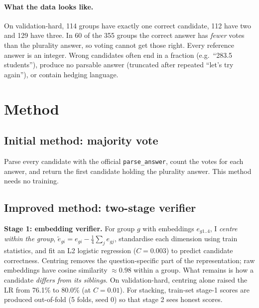 \documentclass[10pt,a4paper]{article}
\begin{document}
\paragraph{What the data looks like.} On validation-hard, 114 groups have exactly one correct candidate, 112 have two and 129 have three. In 60 of the 355 groups the correct answer has \emph{fewer} votes than the plurality answer, so voting cannot get those right. Every reference answer is an integer. Wrong candidates often end in a fraction (e.g.\ ``283.5 students''), produce no parsable answer (truncated after repeated ``let's try again''), or contain hedging language.

\section{Method}
\subsection{Initial method: majority vote}
Parse every candidate with the official \texttt{parse\_answer}, count the votes for each answer, and return the first candidate holding the plurality answer. This method needs no training.

\subsection{Improved method: two-stage verifier}
\textbf{Stage 1: embedding verifier.} For group $g$ with embeddings $e_{g1..4}$, I \emph{centre within the group}, $\tilde e_{gi}=e_{gi}-\frac14\sum_j e_{gj}$, standardise each dimension using train statistics, and fit an L2 logistic regression ($C=0.003$) to predict candidate correctness. Centring removes the question-specific part of the representation; raw embeddings have cosine similarity ${\approx}0.98$ within a group. What remains is how a candidate \emph{differs from its siblings}. On validation-hard, centring alone raised the LR from 76.1\% to 80.0\% (at $C=0.01$). For stacking, train-set stage-1 scores are produced out-of-fold (5 folds, seed 0) so that stage 2 sees honest scores.
\end{document}
